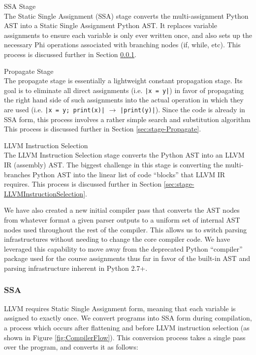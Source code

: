 \documentclass[11pt,twocolumn]{article}
\newenvironment{packed_desc}{
\begin{description}
  \setlength{\itemsep}{1pt}
  \setlength{\parskip}{0pt}
  \setlength{\parsep}{0pt}
}{\end{description}}
\begin{document}
\begin{packed_desc}
\item[SSA Stage] \hfill \\
  The Static Single Assignment (SSA) stage converts
  the multi-assignment Python AST into a Static Single Assignment
  Python AST. It replaces variable assignments to ensure each variable
  is only ever written once, and also sets up the necessary Phi operations
  associated with branching nodes (if, while, etc).
  This process is discussed further in Section \ref{sec:stage-SSA}.
\item[Propagate Stage] \hfill \\
  The propagate stage is essentially a
  lightweight constant propagation stage. Its goal is to eliminate
  all direct assignments (i.e. \texttt{|x = y|}) in favor of propagating
  the right hand side of such assignments into the actual operation in
  which they are used (i.e. \texttt{|x = y; print(x)|} $\rightarrow$
  \texttt{|print(y)|}). Since the code is already in SSA form, this
  process involves a rather simple search and substitution algorithm
  This process is discussed further in Section \ref{sec:stage-Propagate}.
\item[LLVM Instruction Selection] \hfill \\
  The LLVM Instruction Selection stage
  converts the Python AST into an LLVM IR (assembly) AST. The biggest
  challenge in this stage is converting the multi-branches Python AST
  into the linear list of code ``blocks'' that LLVM IR requires. This
  process is discussed further in Section
  \ref{sec:stage-LLVMInstructionSelection}.
\end{packed_desc}

We have also created a new initial compiler pass that converts the AST
nodes from whatever format a given parser outputs to a uniform set of
internal AST nodes used throughout the rest of the compiler. This
allows us to switch parsing infrastructures without needing to change
the core compiler code. We have leveraged this capability to move away
from the deprecated Python ``compiler'' package used for the course
assignments thus far in favor of the built-in AST and parsing
infrastructure inherent in Python 2.7+.

\subsubsection{SSA}
\label{sec:stage-SSA}


LLVM requires Static Single Assignment form, meaning that each
variable is assigned to exactly once.  We convert programs into SSA
form during compilation, a process which
occurs after flattening and before LLVM instruction
selection (as shown in Figure \ref{fig:CompilerFlow}).  This
conversion process takes a single pass over the program, and converts
it as follows:
\end{document}
